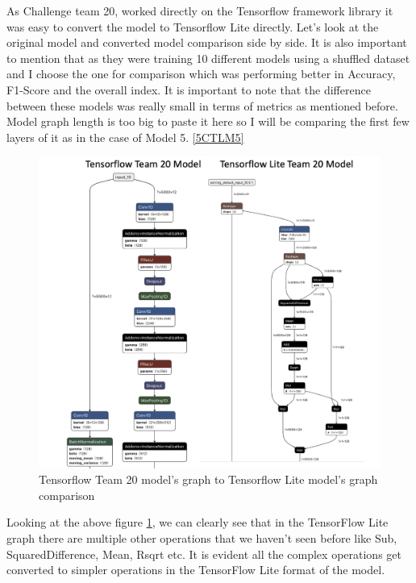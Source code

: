 As Challenge team 20, worked directly on the Tensorflow framework library it was easy to convert the model to Tensorflow Lite directly. Let's look at the original model and converted model comparison side by side. It is also important to mention that as they were training 10 different models using a shuffled dataset and I choose the one for comparison which was performing better in Accuracy, F1-Score and the overall index. It is important to note that the difference between these models was really small in terms of metrics as mentioned before. Model graph length is too big to paste it here so I will be comparing the first few layers of it as in the case of Model 5. \ref{5CTLM5} 


\begin{figure}[H]
\centering
\includegraphics[scale=0.65]{img/team20_conversion_comparison.png}
\caption{Tensorflow Team 20 model's graph to Tensorflow Lite model's graph comparison}
\label{team20_conversion_comparison}
\end{figure}

Looking at the above figure \ref{team20_conversion_comparison}, we can clearly see that in the TensorFlow Lite graph there are multiple other operations that we haven't seen before like Sub, SquaredDifference, Mean, Rsqrt etc. It is evident all the complex operations get converted to simpler operations in the TensorFlow Lite format of the model.  



